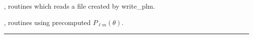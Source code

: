 \begin{related}
  \begin{sulist}{} %
  \item[\htmlref{read\_dbintab}{sub:read_dbintab}, \htmlref{read\_bintab}{sub:read_bintab}] routines which reads a file created by write\_plm. 
  \item[\htmlref{map2alm}{sub:map2alm}, \htmlref{alm2map}{sub:alm2map}] routines using precomputed $P_{\ell m}(\theta)$.
  \end{sulist}
\end{related}

\rule{\hsize}{2mm}

\newpage
